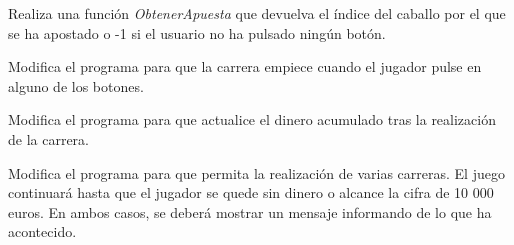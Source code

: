 \begin{exercise}
	Realiza una función \textit{ObtenerApuesta} que devuelva el índice del caballo por el que se ha apostado o -1 si el usuario no ha pulsado ningún botón. 
\end{exercise}

\begin{exercise}
	Modifica el programa para que la carrera empiece cuando el jugador pulse en alguno de los botones.	
\end{exercise}

\begin{exercise}
	Modifica el programa para que actualice el dinero acumulado tras la realización de la carrera.
\end{exercise}

\begin{exercise}
	Modifica el programa para que permita la realización de varias carreras. El juego continuará hasta que el jugador se quede sin dinero o alcance la cifra de 10 000 euros. En ambos casos, se deberá mostrar un mensaje informando de lo que ha acontecido.
\end{exercise}

